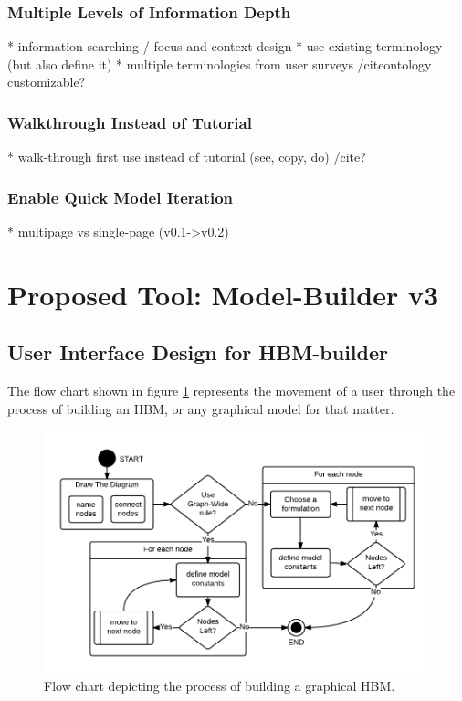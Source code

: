 \documentclass[conference]{IEEEtran}
\begin{document}

\subsubsection{Multiple Levels of Information Depth}
* information-searching / focus and context design
* use existing terminology (but also define it)
* multiple terminologies from user surveys /cite{ontology} customizable? 

\subsubsection{Walkthrough Instead of Tutorial}
* walk-through first use instead of tutorial (see, copy, do) /cite{?}

\subsubsection{Enable Quick Model Iteration}
* multipage vs single-page (v0.1->v0.2)





\section{Proposed Tool: Model-Builder v3}
\subsection{User Interface Design for HBM-builder }
The flow chart shown in figure \ref{HBM-build-process} represents the movement of a user through the process of building an HBM, or any graphical model for that matter.

\begin{figure}[!t]
  \centering
  \includegraphics[width=0.9\columnwidth]{img/HBM-build-process}
  \caption{Flow chart depicting the process of building a graphical HBM.}
  \label{HBM-build-process}
\end{figure}
\end{document}
